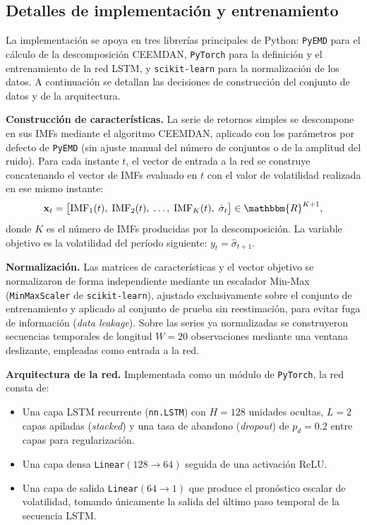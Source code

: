 \documentclass[12pt]{paper}
\begin{document}
\subsection{Detalles de implementación y entrenamiento}
\label{sec:ceemdan-impl}

La implementación se apoya en tres librerías principales de Python: \texttt{PyEMD} para el cálculo de la descomposición CEEMDAN, \texttt{PyTorch} para la definición y el entrenamiento de la red LSTM, y \texttt{scikit-learn} para la normalización de los datos. A continuación se detallan las decisiones de construcción del conjunto de datos y de la arquitectura.

\textbf{Construcción de características.} La serie de retornos simples se descompone en sus IMFs mediante el algoritmo CEEMDAN, aplicado con los parámetros por defecto de \texttt{PyEMD} (sin ajuste manual del número de conjuntos o de la amplitud del ruido). Para cada instante $t$, el vector de entrada a la red se construye concatenando el vector de IMFs evaluado en $t$ con el valor de volatilidad realizada en ese mismo instante:
\begin{equation}
    \mathbf{x}_t = \bigl[\mathrm{IMF}_1(t),\;\mathrm{IMF}_2(t),\;\ldots,\;\mathrm{IMF}_K(t),\;\hat{\sigma}_t\bigr] \in \mathbbm{R}^{K+1},
\end{equation}
donde $K$ es el número de IMFs producidas por la descomposición. La variable objetivo es la volatilidad del período siguiente: $y_t = \hat{\sigma}_{t+1}$.

\textbf{Normalización.} Las matrices de características y el vector objetivo se normalizaron de forma independiente mediante un escalador Min-Max (\texttt{MinMaxScaler} de \texttt{scikit-learn}), ajustado exclusivamente sobre el conjunto de entrenamiento y aplicado al conjunto de prueba sin reestimación, para evitar fuga de información (\textit{data leakage}). Sobre las series ya normalizadas se construyeron secuencias temporales de longitud $W = 20$ observaciones mediante una ventana deslizante, empleadas como entrada a la red.

\textbf{Arquitectura de la red.} Implementada como un módulo de \texttt{PyTorch}, la red consta de:
\begin{itemize}
    \item Una capa LSTM recurrente (\texttt{nn.LSTM}) con $H = 128$ unidades ocultas, $L = 2$ capas apiladas (\textit{stacked}) y una tasa de abandono (\textit{dropout}) de $p_d = 0.2$ entre capas para regularización.
    \item Una capa densa \texttt{Linear}$(128 \to 64)$ seguida de una activación ReLU.
    \item Una capa de salida \texttt{Linear}$(64 \to 1)$ que produce el pronóstico escalar de volatilidad, tomando únicamente la salida del último paso temporal de la secuencia LSTM.
\end{itemize}
\end{document}
